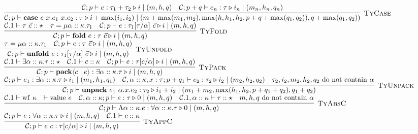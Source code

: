 \documentclass[fleqn]{article}
\begin{document}
\[\begin{array}{l}
	\infer[\textsc{TyCase}]{\jtygc{\mathcal{C};p }{ \mathbf{case}~e~x.e_1~x.e_2 }{ \tau }{ i + \max(i_1,i_2) }{ m + \max(m_1,m_2)}{\max(h,h_1,h_2,p+q+\max(q_1,q_2))}{q+\max(q_1,q_2)} }{\jtygc{\mathcal{C};p}{e}{ \tau_1 + \tau_2 }{ i }{ m}{h}{q} & \jtygc{\mathcal{C};p+q }{ e_n }{ \tau }{ i_n }{ m_n}{h_n}{q_n} } \\
	
	\infer[\textsc{TyFold}]{\jtygc{\mathcal{C};p }{ \mathbf{fold}~e }{ \tau~\vec{c} }{ i }{ m}{h}{q} }{\mathcal{C}.1 \vdash \tau~\vec{c} :: \star & \tau = \mu \alpha :: \kappa. \tau_1 & \jtygc{\mathcal{C};p }{ e }{\tau_1[\tau/\alpha]~\vec{c} }{ i }{ m}{h}{q} } \\
	
	\infer[\textsc{TyUnfold}]{\jtygc{\mathcal{C};p }{ \mathbf{unfold}~e }{ \tau_1[\tau/\alpha]~\vec{c} }{ i }{ m}{h}{q} }{\tau = \mu \alpha :: \kappa. \tau_1 & \jtygc{\mathcal{C};p }{ e }{ \tau~\vec{c} }{ i }{ m}{h}{q} } \\
	
	\infer[\textsc{TyPack}]{\jtygc{\mathcal{C};p }{ \mathbf{pack}\langle c \mid e \rangle }{ \exists \alpha :: \kappa. \tau }{ i }{ m}{h}{q} }{\mathcal{C}.1 \vdash \exists \alpha :: \kappa. \tau :: \star & \mathcal{C}.1 \vdash c :: \kappa & \jtygc{\mathcal{C};p }{ e }{ \tau[c/\alpha] }{ i }{ m}{h}{q}} \\
	
	\infer[\textsc{TyUnpack}]{\jtygc{\mathcal{C};p }{ \mathbf{unpack}~e_1~\alpha.x.e_2 }{ \tau_2 }{ i_1 + i_2 }{ m_1 + m_2}{\max(h_1,h_2,p+q_1+q_2)}{q_1+q_2} }{\jtygc{\mathcal{C};p }{ e_1 }{ \exists \alpha :: \kappa. \tau }{ i_1 }{ m_1}{h_1}{q_1} & \jtygc{\mathcal{C},\alpha::\kappa,x:\tau;p+q_1 }{ e_2 }{ \tau_2 }{ i_2 }{ m_2}{h_2}{q_2} & \tau_2,i_2,m_2,h_2,q_2~\mathrm{do~not~contain}~\alpha} \\
	
	\infer[\textsc{TyAbsC}]{\jtygc{\mathcal{C};p }{ \Lambda \alpha :: \kappa. e }{\forall \alpha :: \kappa. \tau }{ 0 }{ m}{h}{q} }{\mathcal{C}.1 \vdash \mathrm{wf}~\kappa & \vdash \mathrm{value}~e & \jtygc{\mathcal{C},\alpha :: \kappa;p }{ e }{ \tau }{ 0 }{ m }{h}{q} & \mathcal{C}.1,\alpha :: \kappa \vdash \tau :: \star & m,h,q~\mathrm{do~not~contain}~\alpha} \\
	
	\infer[\textsc{TyAppC}]{\jtygc{\mathcal{C};p }{ e~c }{\tau[c/\alpha] }{ i }{ m}{h}{q} }{\jtygc{\mathcal{C};p }{ e }{\forall \alpha :: \kappa. \tau }{ i }{ m}{h}{q} & \mathcal{C}.1 \vdash c :: \kappa} \\
	

\end{array}\]
\end{document}
